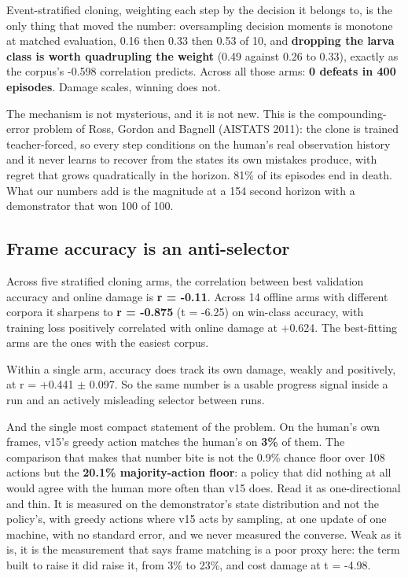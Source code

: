 \documentclass[11pt]{article}
\begin{document}
Event-stratified cloning, weighting each step by the decision it belongs to, is the only thing that moved the number: oversampling decision moments is monotone at matched evaluation, 0.16 then 0.33 then 0.53 of 10, and \textbf{dropping the larva class is worth quadrupling the weight} (0.49 against 0.26 to 0.33), exactly as the corpus's -0.598 correlation predicts. Across all those arms: \textbf{0 defeats in 400 episodes}. Damage scales, winning does not.

The mechanism is not mysterious, and it is not new. This is the compounding-error problem of Ross, Gordon and Bagnell (AISTATS 2011): the clone is trained teacher-forced, so every step conditions on the human's real observation history and it never learns to recover from the states its own mistakes produce, with regret that grows quadratically in the horizon. 81\% of its episodes end in death. What our numbers add is the magnitude at a 154 second horizon with a demonstrator that won 100 of 100.

\subsection{Frame accuracy is an anti-selector}
\label{sec:6.2}

Across five stratified cloning arms, the correlation between best validation accuracy and online damage is \textbf{r = -0.11}. Across 14 offline arms with different corpora it sharpens to \textbf{r = -0.875} (t = -6.25) on win-class accuracy, with training loss positively correlated with online damage at +0.624. The best-fitting arms are the ones with the easiest corpus.

Within a single arm, accuracy does track its own damage, weakly and positively, at r = +0.441 $\pm$ 0.097. So the same number is a usable progress signal inside a run and an actively misleading selector between runs.

And the single most compact statement of the problem. On the human's own frames, v15's greedy action matches the human's on \textbf{3\%} of them. The comparison that makes that number bite is not the 0.9\% chance floor over 108 actions but the \textbf{20.1\% majority-action floor}: a policy that did nothing at all would agree with the human more often than v15 does. Read it as one-directional and thin. It is measured on the demonstrator's state distribution and not the policy's, with greedy actions where v15 acts by sampling, at one update of one machine, with no standard error, and we never measured the converse. Weak as it is, it is the measurement that says frame matching is a poor proxy here: the term built to raise it did raise it, from 3\% to 23\%, and cost damage at t = -4.98.
\end{document}
